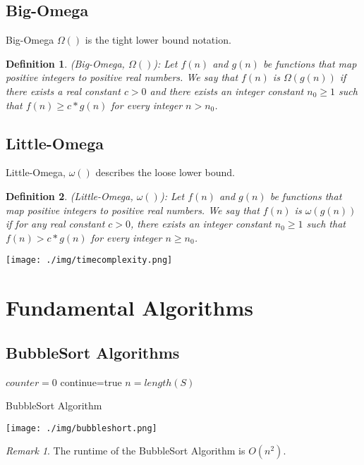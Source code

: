 \documentclass[11pt, a4paper, oneside]{book}
\theoremstyle{theoremdd}
\newtheorem*{definition}{Definition}
\theoremstyle{remark}
\newtheorem*{remark}{Remark}
\begin{document}
\subsection*{Big-Omega}
Big-Omega $\Omega()$ is the tight lower bound notation.
\begin{definition}
(Big-Omega, $\Omega()$): Let $f(n)$ and $g(n)$ be functions that map positive integers to positive real numbers. We say that $f(n)$ is $\Omega(g(n))$ if there exists a real constant $c > 0$ and there exists an integer constant $n_{0} \geq 1$ such that $f(n) \geq c*g(n)$ for every integer $n>n_{0}$.
\end{definition}

\subsection*{Little-Omega}
Little-Omega, $\omega()$ describes the loose lower bound.
\begin{definition}
(Little-Omega, $\omega()$): Let $f(n)$ and $g(n)$ be functions that map positive integers to positive real numbers. We say that $f(n)$ is $\omega(g(n))$ if for any real constant $c > 0$, there exists an integer constant $n_{0} \geq 1$ such that $f(n) > c*g(n)$ for every integer $n \geq n_{0}$.
\end{definition}
\begin{center}
\texttt{[image: ./img/timecomplexity.png]}
\end{center}
\newpage

\section*{Fundamental Algorithms}
\subsection*{BubbleSort Algorithms}
\begin{algorithm}[H]
\SetAlgoLined
{}
$counter=0$\;
continue=true\;
$n=length(S)$\;
\caption{BubbleSort Algorithm}
\end{algorithm}
\begin{center}
\texttt{[image: ./img/bubbleshort.png]}
\end{center}
\begin{remark}
The runtime of the BubbleSort Algorithm is $O(n^2)$.
\end{remark}
\end{document}
